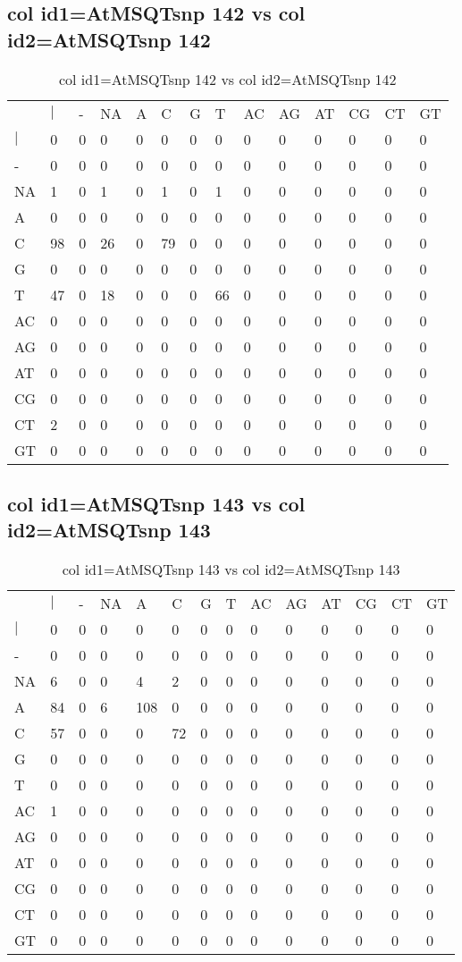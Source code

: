 \subsection{col id1=AtMSQTsnp 142 vs col id2=AtMSQTsnp 142}
\begin{center}
\begin{longtable}{|l|l|l|l|l|l|l|l|l|l|l|l|l|l|}
\caption{col id1=AtMSQTsnp 142 vs col id2=AtMSQTsnp 142} \label{table_dm718}\\
\hline
\\
\hline
&$|$&-&NA&A&C&G&T&AC&AG&AT&CG&CT&GT\\
$|$&0&0&0&0&0&0&0&0&0&0&0&0&0\\
-&0&0&0&0&0&0&0&0&0&0&0&0&0\\
NA&1&0&1&0&1&0&1&0&0&0&0&0&0\\
A&0&0&0&0&0&0&0&0&0&0&0&0&0\\
C&98&0&26&0&79&0&0&0&0&0&0&0&0\\
G&0&0&0&0&0&0&0&0&0&0&0&0&0\\
T&47&0&18&0&0&0&66&0&0&0&0&0&0\\
AC&0&0&0&0&0&0&0&0&0&0&0&0&0\\
AG&0&0&0&0&0&0&0&0&0&0&0&0&0\\
AT&0&0&0&0&0&0&0&0&0&0&0&0&0\\
CG&0&0&0&0&0&0&0&0&0&0&0&0&0\\
CT&2&0&0&0&0&0&0&0&0&0&0&0&0\\
GT&0&0&0&0&0&0&0&0&0&0&0&0&0\\
\hline
\end{longtable}
\end{center}

\subsection{col id1=AtMSQTsnp 143 vs col id2=AtMSQTsnp 143}
\begin{center}
\begin{longtable}{|l|l|l|l|l|l|l|l|l|l|l|l|l|l|}
\caption{col id1=AtMSQTsnp 143 vs col id2=AtMSQTsnp 143} \label{table_dm720}\\
\hline
\\
\hline
&$|$&-&NA&A&C&G&T&AC&AG&AT&CG&CT&GT\\
$|$&0&0&0&0&0&0&0&0&0&0&0&0&0\\
-&0&0&0&0&0&0&0&0&0&0&0&0&0\\
NA&6&0&0&4&2&0&0&0&0&0&0&0&0\\
A&84&0&6&108&0&0&0&0&0&0&0&0&0\\
C&57&0&0&0&72&0&0&0&0&0&0&0&0\\
G&0&0&0&0&0&0&0&0&0&0&0&0&0\\
T&0&0&0&0&0&0&0&0&0&0&0&0&0\\
AC&1&0&0&0&0&0&0&0&0&0&0&0&0\\
AG&0&0&0&0&0&0&0&0&0&0&0&0&0\\
AT&0&0&0&0&0&0&0&0&0&0&0&0&0\\
CG&0&0&0&0&0&0&0&0&0&0&0&0&0\\
CT&0&0&0&0&0&0&0&0&0&0&0&0&0\\
GT&0&0&0&0&0&0&0&0&0&0&0&0&0\\
\hline
\end{longtable}
\end{center}


